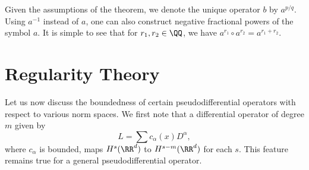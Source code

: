 Given the assumptions of the theorem, we denote the unique operator $b$ by $a^{p/q}$. Using $a^{-1}$ instead of $a$, one can also construct negative fractional powers of the symbol $a$. It is simple to see that for $r_1,r_2 \in \QQ$, we have $a^{r_1} \circ a^{r_2} = a^{r_1 + r_2}$.


\section{Regularity Theory}

Let us now discuss the boundedness of certain pseudodifferential operators with respect to various norm spaces. We first note that a differential operator of degree $m$ given by
%
\[ L = \sum c_\alpha(x) D^\alpha, \]
%
where $c_\alpha$ is bounded, maps $H^s(\RR^d)$ to $H^{s-m}(\RR^d)$ for each $s$. This feature remains true for a general pseudodifferential operator.

